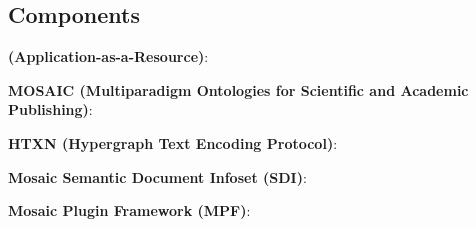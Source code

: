 
\begin{frame}{}
\section{Components}

\vspace{-3pt}
{\thrulex}

{\fontsize{17}{22}\selectfont
\hspace*{13pt}\begin{minipage}{.97\textwidth}
\vspace{-6pt}



		

{\setlength{\leftmargini}{3pt}\begin{enumerate}
\dmitem \textbf{\AtR{} (Application-as-a-Resource)}: \hspace{.25em} 
\vspace{11pt}


\dmitem \textbf{MOSAIC (Multiparadigm Ontologies 
for Scientific and Academic Publishing)}: \hspace{.25em} 
\vspace{11pt}

\dmitem \textbf{HTXN (Hypergraph Text Encoding Protocol)}:  \hspace{.25em} 
\vspace{11pt}

\dmitem \textbf{Mosaic Semantic Document Infoset (SDI)}:  \hspace{.25em} 
\vspace{11pt}

\dmitem \textbf{Mosaic Plugin Framework (MPF)}:  \hspace{.25em} 

\end{enumerate}
}

\end{minipage}
}


\end{frame}
